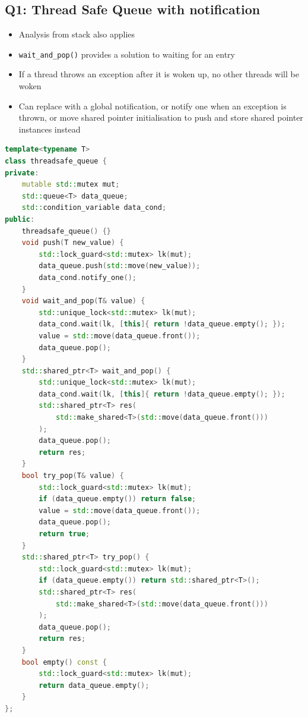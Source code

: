 \documentclass{article}
\begin{document}
\subsection{Q1: Thread Safe Queue with notification}
\begin{itemize}
    \item Analysis from stack also applies
    \item \verb|wait_and_pop()| provides a solution to waiting for an entry
    \item If a thread throws an exception after it is woken up, no other threads will be woken
    \item Can replace with a global notification, or notify one when an exception is thrown, or move shared pointer initialisation to push and store shared pointer instances instead
\end{itemize}

\begin{lstlisting}[language=C++]
template<typename T>
class threadsafe_queue {
private:
    mutable std::mutex mut;
    std::queue<T> data_queue;
    std::condition_variable data_cond;
public:
    threadsafe_queue() {}
    void push(T new_value) {
        std::lock_guard<std::mutex> lk(mut);
        data_queue.push(std::move(new_value));
        data_cond.notify_one();
    }
    void wait_and_pop(T& value) {
        std::unique_lock<std::mutex> lk(mut);
        data_cond.wait(lk, [this]{ return !data_queue.empty(); });
        value = std::move(data_queue.front());
        data_queue.pop();
    }
    std::shared_ptr<T> wait_and_pop() {
        std::unique_lock<std::mutex> lk(mut);
        data_cond.wait(lk, [this]{ return !data_queue.empty(); });
        std::shared_ptr<T> res(
            std::make_shared<T>(std::move(data_queue.front()))
        );
        data_queue.pop();
        return res;
    }
    bool try_pop(T& value) {
        std::lock_guard<std::mutex> lk(mut);
        if (data_queue.empty()) return false;
        value = std::move(data_queue.front());
        data_queue.pop();
        return true;
    }
    std::shared_ptr<T> try_pop() {
        std::lock_guard<std::mutex> lk(mut);
        if (data_queue.empty()) return std::shared_ptr<T>();
        std::shared_ptr<T> res(
            std::make_shared<T>(std::move(data_queue.front()))
        );
        data_queue.pop();
        return res;
    }
    bool empty() const {
        std::lock_guard<std::mutex> lk(mut);
        return data_queue.empty();
    }
};
\end{lstlisting}
\end{document}
